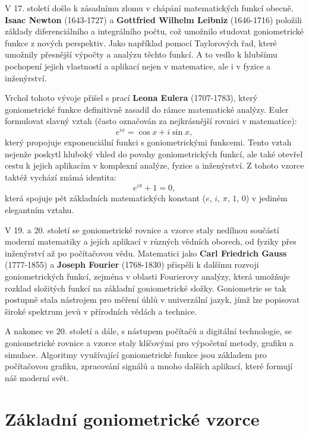 \documentclass[12pt,a4paper]{article}
\begin{document}
\begin{historicalbox}
V 17. století došlo k zásadnímu zlomu v chápání matematických funkcí obecně.
\textbf{Isaac Newton} (1643-1727) a \textbf{Gottfried Wilhelm Leibniz} (1646-1716)
položili základy diferenciálního a integrálního počtu, 
což umožnilo studovat goniometrické funkce z nových perspektiv.
Jako například pomocí Taylorových řad, které umožnily přesnější výpočty a analýzu těchto funkcí.
A to vedlo k hlubšímu pochopení jejich vlastností a aplikací nejen v matematice, ale i v fyzice a inženýrství.

Vrchol tohoto vývoje přišel s prací \textbf{Leona Eulera} (1707-1783),
který goniometrické funkce definitivně zasadil do rámce matematické analýzy.
Euler formulovat slavný vztah (často označován za nejkrásnější rovnici v matematice):
\[e^{ix} = \cos x + i\sin x,\]
který propojuje exponenciální funkci s goniometrickými funkcemi.
Tento vztah nejenže poskytl hluboký vhled do povahy goniometrických funkcí,
ale také otevřel cestu k jejich aplikacím v komplexní analýze, fyzice a inženýrství.
Z tohoto vzorce taktéž vychází známá identita:
\[e^{i\pi} + 1 = 0,\]
která spojuje pět základních matematických konstant ($e$, $i$, $\pi$, $1$, $0$) v jediném elegantním vztahu.

V 19. a 20. století se goniometrické rovnice a vzorce staly nedílnou součástí moderní matematiky
a jejích aplikací v různých vědních oborech, od fyziky přes inženýrství až po počítačovou vědu.
Matematici jako \textbf{Carl Friedrich Gauss} (1777-1855) a \textbf{Joseph Fourier} (1768-1830)
přispěli k dalšímu rozvoji goniometrických funkcí, zejména v oblasti Fourierovy analýzy,
která umožňuje rozklad složitých funkcí na základní goniometrické složky.
Goniometrie se tak postupně stala nástrojem pro měření úhlů v univerzální jazyk, jímž 
lze popisovat široké spektrum jevů v přírodních vědách a technice.

A nakonec ve 20. století a dále, s nástupem počítačů a digitální technologie,
se goniometrické rovnice a vzorce staly klíčovými pro výpočetní metody,
grafiku a simulace. Algoritmy využívající goniometrické funkce jsou
základem pro počítačovou grafiku, zpracování signálů a mnoho dalších aplikací,
které formují náš moderní svět.


\end{historicalbox}    

\section{Základní goniometrické vzorce}
\end{document}
